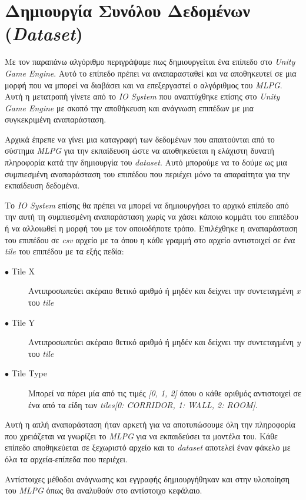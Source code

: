 \section{Δημιουργία Συνόλου Δεδομένων (\textit{Dataset})}
Με τον παραπάνω αλγόριθμο περιγράψαμε πως δημιουργείται ένα επίπεδο στο \textit{Unity Game Engine}. Αυτό το επίπεδο πρέπει να αναπαρασταθεί και να αποθηκευτεί σε μια μορφή που να μπορεί να διαβάσει και να επεξεργαστεί ο αλγόριθμος του \textit{MLPG}. Αυτή η μετατροπή γίνετε από το \textit{IO System} που αναπτύχθηκε επίσης στο \textit{Unity Game Engine} με σκοπό την αποθήκευση και ανάγνωση επιπέδων με μια συγκεκριμένη αναπαράσταση.
\par
Αρχικά έπρεπε να γίνει μια καταγραφή των δεδομένων που απαιτούνται από το σύστημα \textit{MLPG} για την εκπαίδευση ώστε να αποθηκεύεται η ελάχιστη δυνατή πληροφορία κατά την δημιουργία του \textit{dataset}. Αυτό μπορούμε να το δούμε ως μια συμπιεσμένη αναπαράσταση του επιπέδου που περιέχει μόνο τα απαραίτητα για την εκπαίδευση δεδομένα.
\par
Το \textit{IO System} επίσης θα πρέπει να μπορεί να δημιουργήσει το αρχικό επίπεδο από την αυτή τη συμπιεσμένη αναπαράσταση χωρίς να χάσει κάποιο κομμάτι του επιπέδου ή να αλλοιωθεί η μορφή του με τον οποιοδήποτε τρόπο. Επιλέχθηκε η αναπαράσταση του επιπέδου σε \textit{csv} αρχείο με τα όπου η κάθε γραμμή στο αρχείο αντιστοιχεί σε ένα \textit{tile} του επιπέδου με τα εξής πεδία:

\begin{description}
\item[$\bullet$ Tile X] Αντιπροσωπεύει ακέραιο θετικό αριθμό ή μηδέν και δείχνει την συντεταγμένη \textit{x} του \textit{tile}
\item[$\bullet$ Tile Y] Αντιπροσωπεύει ακέραιο θετικό αριθμό ή μηδέν και δείχνει την συντεταγμένη \textit{y} του \textit{tile}
\item[$\bullet$ Tile Type] Μπορεί να πάρει μία από τις τιμές \textit{[0, 1, 2]} όπου ο κάθε αριθμός αντιστοιχεί σε ένα από τα είδη των \textit{tiles}\textit{[0: CORRIDOR, 1: WALL, 2: ROOM]}.
\end{description}

Αυτή η απλή αναπαράσταση ήταν αρκετή για να αποτυπώσουμε όλη την πληροφορία που χρειάζεται να γνωρίζει το \textit{MLPG} για να εκπαιδεύσει τα μοντέλα του. Κάθε επίπεδο αποθηκεύεται σε ξεχωριστό αρχείο και το \textit{dataset} αποτελεί έναν φάκελο με όλα τα αρχεία-επίπεδα που περιέχει.
\par
Αντίστοιχες μέθοδοι ανάγνωσης και εγγραφής δημιουργήθηκαν και στην υλοποίηση του \textit{MLPG} όπως θα αναλυθούν στο αντίστοιχο κεφάλαιο.













